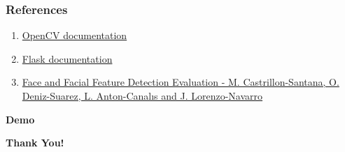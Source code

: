 \documentclass[14pt]{beamer}
\begin{document}
\begin{frame}
    \frametitle{References}
    \begin{enumerate}
        \item \href{https://opencv.org/}{OpenCV documentation} 
        \item \href{https://flask.palletsprojects.com/en/1.1.x/}{Flask documentation} 
        \item \href{http://alereimondo.no-ip.org/OpenCV/uploads/37/CameraReadyPaper63.pdf}{Face and Facial Feature Detection Evaluation  \newline - M. Castrillon-Santana, O. Deniz-Suarez, L. Anton-Canalıs and J. Lorenzo-Navarro}
    \end{enumerate}
\end{frame}

\begin{frame}[c]{ }
    \centering
\huge \textbf{Demo}
\end{frame}
\begin{frame}[c]{ }
    \centering
\huge \textbf{Thank You!}
\end{frame}
\end{document}
